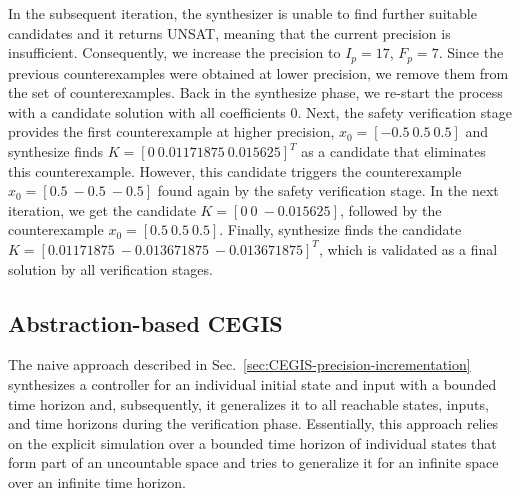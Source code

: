 \documentclass[runningheads,a4paper]{llncs}
\begin{document}
In the subsequent iteration, the synthesizer is unable to find further 
suitable candidates and it returns UNSAT, meaning that the current precision is
insufficient.  Consequently, we increase the precision to $I_p=17$,
$F_p=7$.
%
Since the previous counterexamples were obtained at lower precision,
we remove them from the set of counterexamples.  Back in the {\sc
  synthesize} phase, we re-start the process with a candidate solution
with all coefficients $0$.  Next, the {\sc safety} verification stage
provides the first counterexample at higher precision, $x_0=[-0.5
  \ 0.5 \ 0.5]$ and {\sc synthesize} finds $K=[0 \ 0.01171875
  \ 0.015625]^T$ as a candidate that eliminates this counterexample.
However, this candidate triggers the counterexample
$x_0=[0.5\ -0.5\ -0.5]$ found again by the {\sc safety} verification
stage.  In the next iteration, we get the candidate $K=[0 \ 0
  \ -0.015625]$, followed by the counterexample $x_0 = [0.5 \ 0.5
  \ 0.5]$. Finally, {\sc synthesize} finds the candidate $K=[0.01171875
  \ -0.013671875 \ -0.013671875]^T$, which is validated as a final
solution by all verification stages.

\subsection{Abstraction-based CEGIS}
\label{sec:CEGIS-abstraction-refinement}



  The naive approach described in Sec.~\ref{sec:CEGIS-precision-incrementation}
  synthesizes a controller for an individual initial state
and input with a bounded time horizon and, subsequently, it generalizes it to all reachable states,
inputs, and time horizons during the verification phase.
Essentially, this approach relies on the explicit
simulation over a bounded time horizon of individual states that form
part of an uncountable space and tries to generalize it for an
infinite space over an infinite time horizon.

\end{document}

